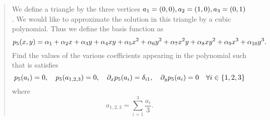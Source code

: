 \documentclass[english]{exercise}
\begin{document}
    \begin{quote}
        We define a triangle by the three vertices \(a_1 = \parentheses*{0, 0}, a_2 = \parentheses*{1, 0}, a_3 = \parentheses*{0, 1}\).
        We would like to approximate the solution in this triangle by a cubic polynomial.
        Thus we define the basis function as
        \[
            p_5\parentheses*{x, y} = \alpha_1 + \alpha_2 x + \alpha_3 y + \alpha_4 xy + \alpha_5 x^2 + \alpha_6 y^2 + \alpha_7 x^2 y + \alpha_8 xy^2 + \alpha_9 x^3 + \alpha_{10}y^3.
        \]
        Find the values of the various coefficients appearing in the polynomial such that is satisfies
        \[
            p_5\parentheses*{a_i} = 0, \quad p_5\parentheses*{a_{1, 2, 3}} = 0, \quad \partial_x p_5\parentheses*{a_i} = \delta_{i1}, \quad \partial_y p_5\parentheses*{a_i} = 0 \quad \forall i \in \braces*{1, 2, 3}
        \]
        where
        \[
            a_{1, 2, 3} = \sum_{i = 1}^3 \frac{a_i}{3}.
        \]
    \end{quote}
\end{document}

